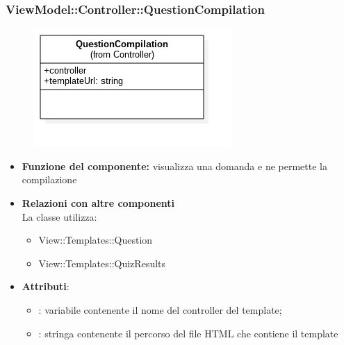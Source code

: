  \subsubsection{ViewModel::Controller::QuestionCompilation}
 \begin{figure}[h!]
\begin{center}
	\includegraphics[scale=0.6]{../images/ViewModel/Controller/QuestionCompilation.png}
\end{center}
\end{figure}
 \begin{itemize}
 \item\textbf{Funzione del componente:} visualizza una domanda e ne permette la compilazione
 \item\textbf{Relazioni con altre componenti}\\
 La classe utilizza:
 	\begin{itemize}
 		\item View::Templates::Question
 		\item View::Templates::QuizResults
 	\end{itemize}
 \item\textbf{Attributi}:
 	\begin{itemize}
 		\item{}: variabile contenente il nome del controller del template;\\
		
		\item{}: stringa contenente il percorso del file HTML che contiene il template\\
 	\end{itemize}
 \end{itemize}
\newpage
 
